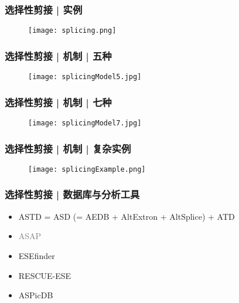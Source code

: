 \begin{frame}
	\frametitle{选择性剪接 | 实例}
	\begin{figure}
		\centering
		\texttt{[image: splicing.png]}
	\end{figure}
\end{frame}

\begin{frame}
	\frametitle{选择性剪接 | 机制 | 五种}
	\begin{figure}
		\centering
		\texttt{[image: splicingModel5.jpg]}
	\end{figure}
\end{frame}

\begin{frame}
	\frametitle{选择性剪接 | 机制 | 七种}
	\begin{figure}
		\centering
		\texttt{[image: splicingModel7.jpg]}
	\end{figure}
\end{frame}

\begin{frame}
	\frametitle{选择性剪接 | 机制 | 复杂实例}
	\begin{figure}
		\centering
		\texttt{[image: splicingExample.png]}
	\end{figure}
\end{frame}

\begin{frame}
	\frametitle{选择性剪接 | 数据库与分析工具}
	\begin{itemize}
		\item ASTD = ASD (= AEDB + AltExtron + AltSplice) + ATD
		\item \textcolor{gray}{ASAP}
		\item ESEfinder 
		\item RESCUE-ESE
		\item ASPicDB
	\end{itemize}
\end{frame}

